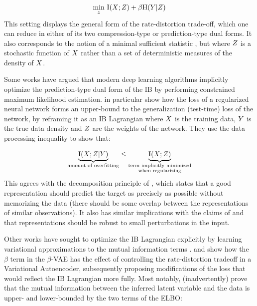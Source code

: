 \documentclass[../thesis.tex]{subfiles}
\begin{document}
\begin{equation}
    \underset{z}{\min} ~ \mathrm{I}(\myrv{x} ; \myrv{z}) + \beta \mathrm{H}(\myrv{y} | \myrv{z})
\end{equation}
This setting displays the general form of the rate-distortion trade-off, which one can reduce in either of its two compression-type or prediction-type dual forms. It also corresponds to the notion of a minimal sufficient statistic \citep{bahadur1954sufficiency}, but where $\myrv{z}$ is a stochastic function of $\myrv{x}$ rather than a set of deterministic measures of the density of $\myrv{x}$. 


Some works \citep{tishby2015deep, shwartz2017opening, achille2018emergence} have argued that modern deep learning algorithms implicitly optimize the prediction-type dual form of the IB by performing constrained maximum likelihood estimation. \citet{achille2018emergence} in particular show how the loss of a regularized neural network forms an upper-bound to the generalization (test-time) loss of the network, by reframing it as an IB Lagrangian where $\myrv{x}$ is the training data, $\myrv{y}$ is the true data density and $\myrv{z}$ are the weights of the network. They use the data processing inequality \citep{cover1999elements} to show that:

\begin{equation}
    \underbrace{\mathrm{I}(\myrv{x}; \myrv{z} | \myrv{y})}_{\text{amount of overfitting}} \leq \underbrace{\mathrm{I}(\myrv{x}; \myrv{z})}_{\substack{\text{term implicitly minimized} \\ \text{when regularizing}}}
\end{equation}
This agrees with the decomposition principle of \citet{mathieu2019disentangling}, which states that a good representation should predict the target as precisely as possible without memorizing the data (there should be some overlap between the representations of similar observations). It also has similar implications with the claims of \citet{bengioRepresentationLearningReview2014} and \citet{bruna2013invariant} that representations should be robust to small perturbations in the input.

Other works have sought to optimize the IB Lagrangian explicitly by learning variational approximations to the mutual information terms \citep{alemi2016deep}. \citet{burgess2018understanding} and \citet{alemi2018fixing} show how the $\beta$ term in the $\beta$-VAE \citep{higgins2016beta} has the effect of controlling the rate-distortion tradeoff in a Variational Autoencoder, subsequently proposing modifications of the loss that would reflect the IB Lagrangian more fully. Most notably, \citet{alemi2016deep} (inadvertently) prove that the mutual information between the inferred latent variable and the data is upper- and lower-bounded by the two terms of the ELBO:
\end{document}
